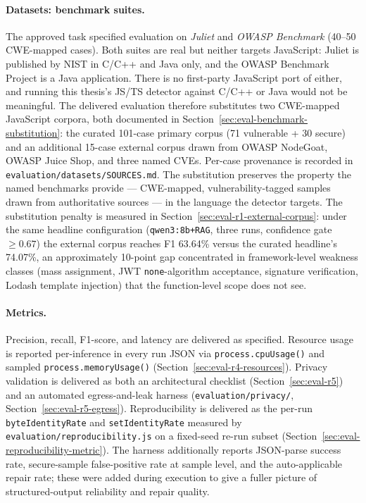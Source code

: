 \paragraph{Datasets: benchmark suites.}
The approved task specified evaluation on \emph{Juliet} and \emph{OWASP Benchmark} (40--50 CWE-mapped cases). Both suites are real but neither targets JavaScript: Juliet is published by NIST in C/C++ and Java only, and the OWASP Benchmark Project is a Java application. There is no first-party JavaScript port of either, and running this thesis's JS/TS detector against C/C++ or Java would not be meaningful. The delivered evaluation therefore substitutes two CWE-mapped JavaScript corpora, both documented in Section~\ref{sec:eval-benchmark-substitution}: the curated 101-case primary corpus (71 vulnerable + 30 secure) and an additional 15-case external corpus drawn from OWASP NodeGoat, OWASP Juice Shop, and three named CVEs. Per-case provenance is recorded in \texttt{evaluation/datasets/SOURCES.md}. The substitution preserves the property the named benchmarks provide --- CWE-mapped, vulnerability-tagged samples drawn from authoritative sources --- in the language the detector targets. The substitution penalty is measured in Section~\ref{sec:eval-r1-external-corpus}: under the same headline configuration (\texttt{qwen3:8b+RAG}, three runs, confidence gate $\geq 0.67$) the external corpus reaches F1 63.64\% versus the curated headline's 74.07\%, an approximately 10-point gap concentrated in framework-level weakness classes (mass assignment, JWT \texttt{none}-algorithm acceptance, signature verification, Lodash template injection) that the function-level scope does not see.

\paragraph{Metrics.}
Precision, recall, F1-score, and latency are delivered as specified. Resource usage is reported per-inference in every run JSON via \texttt{process.cpuUsage()} and sampled \texttt{process.memoryUsage()} (Section~\ref{sec:eval-r4-resources}). Privacy validation is delivered as both an architectural checklist (Section~\ref{sec:eval-r5}) and an automated egress-and-leak harness (\texttt{evaluation/privacy/}, Section~\ref{sec:eval-r5-egress}). Reproducibility is delivered as the per-run \texttt{byteIdentityRate} and \texttt{setIdentityRate} measured by \texttt{evaluation/reproducibility.js} on a fixed-seed re-run subset (Section~\ref{sec:eval-reproducibility-metric}). The harness additionally reports JSON-parse success rate, secure-sample false-positive rate at sample level, and the auto-applicable repair rate; these were added during execution to give a fuller picture of structured-output reliability and repair quality.

